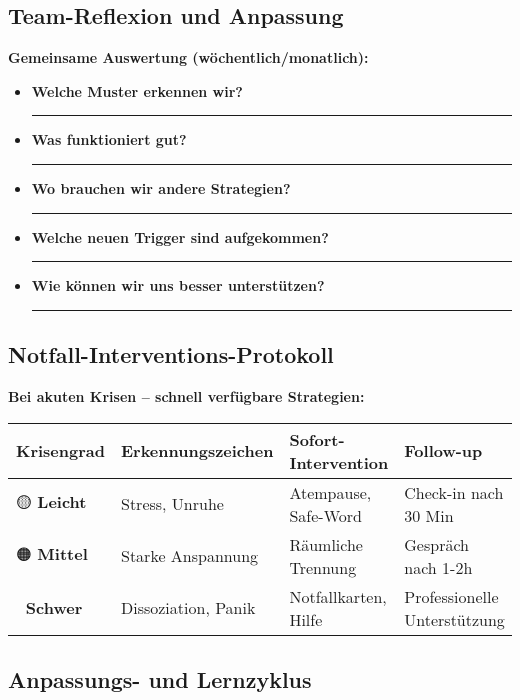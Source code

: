 {\hypertarget{team-reflexion-und-anpassung}{%
\subsection{Team-Reflexion und Anpassung}}\label{team-reflexion-und-anpassung}

\textbf{Gemeinsame Auswertung (wöchentlich/monatlich):}

\begin{itemize}
\tightlist
\item
  \textbf{Welche Muster erkennen wir?} \rule{8cm}{0.4pt}
\item
  \textbf{Was funktioniert gut?} \rule{8cm}{0.4pt}
\item
  \textbf{Wo brauchen wir andere Strategien?} \rule{8cm}{0.4pt}
\item
  \textbf{Welche neuen Trigger sind aufgekommen?} \rule{8cm}{0.4pt}
\item
  \textbf{Wie können wir uns besser unterstützen?} \rule{8cm}{0.4pt}
\end{itemize}

\hypertarget{notfall-interventions-protokoll}{%
\subsection{Notfall-Interventions-Protokoll}}\label{notfall-interventions-protokoll}

\textbf{Bei akuten Krisen -- schnell verfügbare Strategien:}

\begin{center}
\begin{tabular}{|p{2cm}|p{4cm}|p{4cm}|p{3cm}|}
\hline
\textbf{Krisengrad} & \textbf{Erkennungszeichen} & \textbf{Sofort-Intervention} & \textbf{Follow-up} \\
\hline
🟡 \textbf{Leicht} & Stress, Unruhe & Atempause, Safe-Word & Check-in nach 30 Min \\
\hline
🟠 \textbf{Mittel} & Starke Anspannung & Räumliche Trennung & Gespräch nach 1-2h \\
\hline
🔴 \textbf{Schwer} & Dissoziation, Panik & Notfallkarten, Hilfe & Professionelle Unterstützung \\
\hline
\end{tabular}
\end{center}

\hypertarget{anpassungs-und-lernzyklus}{%
\subsection{Anpassungs- und Lernzyklus}}\label{anpassungs-und-lernzyklus}

}
